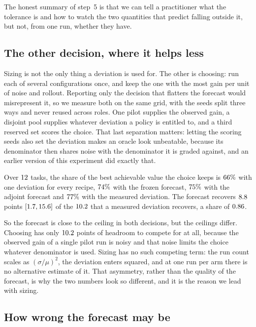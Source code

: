 The honest summary of step~5 is that we can tell a practitioner what the tolerance is and how to
watch the two quantities that predict falling outside it, but not, from one run, whether they have.

\subsection{The other decision, where it helps less}

Sizing is not the only thing a deviation is used for. The other is choosing: run each of several
configurations once, and keep the one with the most gain per unit of noise and rollout. Reporting
only the decision that flatters the forecast would misrepresent it, so we measure both on the same
grid, with the seeds split three ways and never reused across roles. One pilot supplies the
observed gain, a disjoint pool supplies whatever deviation a policy is entitled to, and a third
reserved set scores the choice. That last separation matters: letting the scoring seeds also set
the deviation makes an oracle look unbeatable, because its denominator then shares noise with the
denominator it is graded against, and an earlier version of this experiment did exactly that.

Over $12$ tasks, the share of the best achievable value the choice keeps is
$66\%$ with one deviation for every recipe, $74\%$ with the frozen
forecast, $75\%$ with the adjoint forecast and $77\%$ with the measured
deviation. The forecast recovers $8.8$ points
$[1.7, 15.6]$ of the $10.2$ that a measured deviation
recovers, a share of $0.86$.

So the forecast is close to the ceiling in both decisions, but the ceilings differ. Choosing has
only $10.2$ points of headroom to compete for at all, because the observed gain of a
single pilot run is noisy and that noise limits the choice whatever denominator is used. Sizing has
no such competing term: the run count scales as $(\sigma/\mu)^2$, the deviation enters squared, and
at one run per arm there is no alternative estimate of it. That asymmetry, rather than the quality
of the forecast, is why the two numbers look so different, and it is the reason we lead with
sizing.

\subsection{How wrong the forecast may be}

